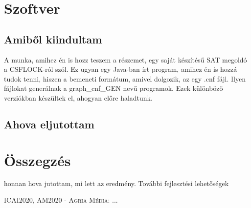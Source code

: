 \documentclass[
]{thesis-ekf}
\newtheorem{tetel}{Tétel}[chapter]
\theoremstyle{definition}
\theoremstyle{remark}
\begin{document}
	\chapter{Szoftver}
	\section{Amiből kiindultam}
	A munka, amihez én is hozz teszem a részemet, egy saját készítésű SAT megoldó a CSFLOCK-ról szól. Ez ugyan egy Java-ban írt program, amihez én is hozzá tudok tenni, hiszen a bemeneti formátum, amivel dolgozik, az egy .cnf fájl. Ilyen fájlokat generálnak a graph\_cnf\_GEN nevű programok. Ezek különböző verziókban készültek el, ahogyan előre haladtunk.
	
	\section{Ahova eljutottam}
	
%	

	
	\chapter*{Összegzés}
	honnan hova jutottam, mi lett az eredmény. További fejlesztési lehetőségek

	
	\begin{thebibliography}{2}
		\textsc{ICAI2020, AM2020 - Agria Média}: ...
	\end{thebibliography}
	
	
\end{document}
